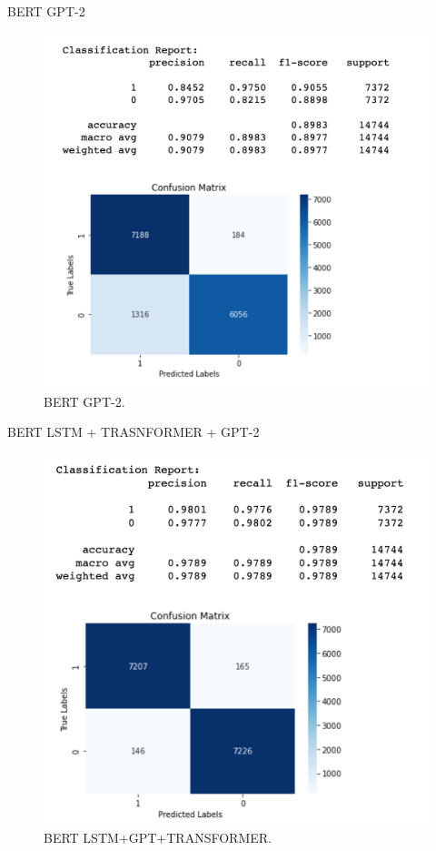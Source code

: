 \documentclass[11pt]{article}
\begin{document}
BERT GPT-2
\begin{figure}[H]
    \centering
       \includegraphics[scale=.6]{figures/BERT GPT.png}
   \caption{BERT GPT-2.}
   \label{fig:3}
\end{figure}

BERT LSTM + TRASNFORMER + GPT-2
\begin{figure}[H]
    \centering
       \includegraphics[scale=.6]{figures/LSTM+GPT+TRANSFORMER.png}
   \caption{BERT LSTM+GPT+TRANSFORMER.}
   \label{fig:4}
\end{figure}
\end{document}

